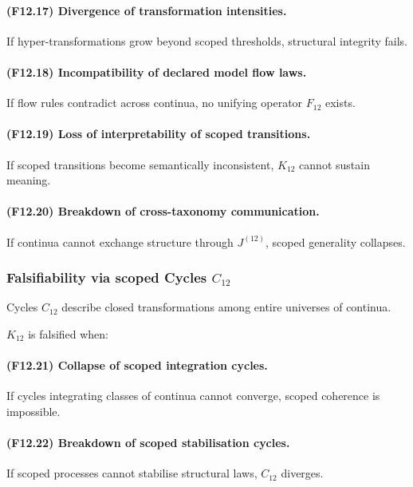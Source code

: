 \paragraph{(F12.17) Divergence of transformation intensities.}
If hyper-transformations grow beyond scoped thresholds,
structural integrity fails.

\paragraph{(F12.18) Incompatibility of declared model flow laws.}
If flow rules contradict across continua,
no unifying operator $F_{12}$ exists.

\paragraph{(F12.19) Loss of interpretability of scoped transitions.}
If scoped transitions become semantically inconsistent,
$K_{12}$ cannot sustain meaning.

\paragraph{(F12.20) Breakdown of cross-taxonomy communication.}
If continua cannot exchange structure through $J^{(12)}$,
scoped generality collapses.



\subsubsection{Falsifiability via scoped Cycles $C_{12}$}

Cycles $C_{12}$ describe closed transformations among entire universes
of continua.

$K_{12}$ is falsified when:

\paragraph{(F12.21) Collapse of scoped integration cycles.}
If cycles integrating classes of continua cannot converge,
scoped coherence is impossible.

\paragraph{(F12.22) Breakdown of scoped stabilisation cycles.}
If scoped processes cannot stabilise structural laws,
$C_{12}$ diverges.

